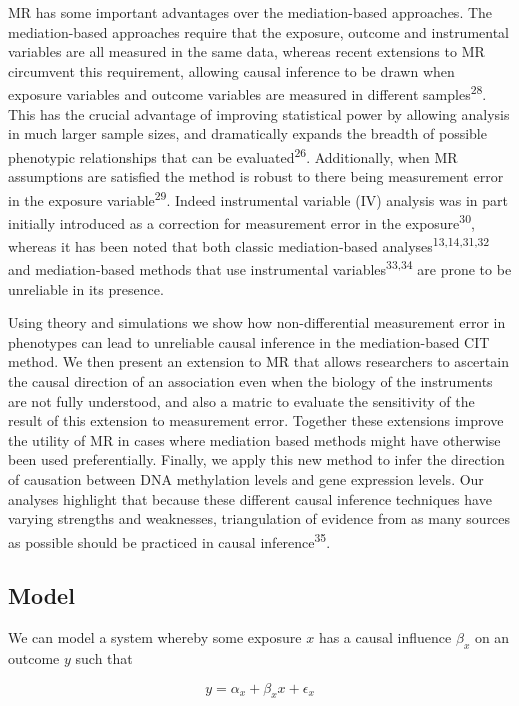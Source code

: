\documentclass[]{article}
\begin{document}
MR has some important advantages over the mediation-based approaches.
The mediation-based approaches require that the exposure, outcome and
instrumental variables are all measured in the same data, whereas recent
extensions to MR circumvent this requirement, allowing causal inference
to be drawn when exposure variables and outcome variables are measured
in different samples\textsuperscript{28}. This has the crucial advantage
of improving statistical power by allowing analysis in much larger
sample sizes, and dramatically expands the breadth of possible
phenotypic relationships that can be evaluated\textsuperscript{26}.
Additionally, when MR assumptions are satisfied the method is robust to
there being measurement error in the exposure
variable\textsuperscript{29}. Indeed instrumental variable (IV) analysis
was in part initially introduced as a correction for measurement error
in the exposure\textsuperscript{30}, whereas it has been noted that both
classic mediation-based analyses\textsuperscript{13,14,31,32} and
mediation-based methods that use instrumental
variables\textsuperscript{33,34} are prone to be unreliable in its
presence.

Using theory and simulations we show how non-differential measurement
error in phenotypes can lead to unreliable causal inference in the
mediation-based CIT method. We then present an extension to MR that
allows researchers to ascertain the causal direction of an association
even when the biology of the instruments are not fully understood, and
also a matric to evaluate the sensitivity of the result of this
extension to measurement error. Together these extensions improve the
utility of MR in cases where mediation based methods might have
otherwise been used preferentially. Finally, we apply this new method to
infer the direction of causation between DNA methylation levels and gene
expression levels. Our analyses highlight that because these different
causal inference techniques have varying strengths and weaknesses,
triangulation of evidence from as many sources as possible should be
practiced in causal inference\textsuperscript{35}.

\subsection{Model}\label{model}

We can model a system whereby some exposure \(x\) has a causal influence
\(\beta_x\) on an outcome \(y\) such that

\[
y = \alpha_x + \beta_x x + \epsilon_x
\]
\end{document}
